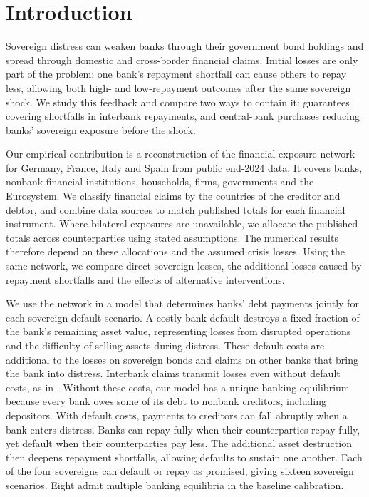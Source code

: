 \documentclass[preprint,12pt,authoryear]{elsarticle}
\begin{document}


\section{Introduction}

Sovereign distress can weaken banks through their government bond holdings and spread through domestic and cross-border financial claims. Initial losses are only part of the problem: one bank's repayment shortfall can cause others to repay less, allowing both high- and low-repayment outcomes after the same sovereign shock. We study this feedback and compare two ways to contain it: guarantees covering shortfalls in interbank repayments, and central-bank purchases reducing banks' sovereign exposure before the shock.

Our empirical contribution is a reconstruction of the financial exposure network for Germany, France, Italy and Spain from public end-2024 data. It covers banks, nonbank financial institutions, households, firms, governments and the Eurosystem. We classify financial claims by the countries of the creditor and debtor, and combine data sources to match published totals for each financial instrument. Where bilateral exposures are unavailable, we allocate the published totals across counterparties using stated assumptions. The numerical results therefore depend on these allocations and the assumed crisis losses. Using the same network, we compare direct sovereign losses, the additional losses caused by repayment shortfalls and the effects of alternative interventions.

We use the network in a model that determines banks' debt payments jointly for each sovereign-default scenario. A costly bank default destroys a fixed fraction of the bank's remaining asset value, representing losses from disrupted operations and the difficulty of selling assets during distress. These default costs are additional to the losses on sovereign bonds and claims on other banks that bring the bank into distress. Interbank claims transmit losses even without default costs, as in \citet{EisenbergNoe2001}. Without these costs, our model has a unique banking equilibrium because every bank owes some of its debt to nonbank creditors, including depositors. With default costs, payments to creditors can fall abruptly when a bank enters distress. Banks can repay fully when their counterparties repay fully, yet default when their counterparties pay less. The additional asset destruction then deepens repayment shortfalls, allowing defaults to sustain one another. Each of the four sovereigns can default or repay as promised, giving sixteen sovereign scenarios. Eight admit multiple banking equilibria in the baseline calibration.
\end{document}

